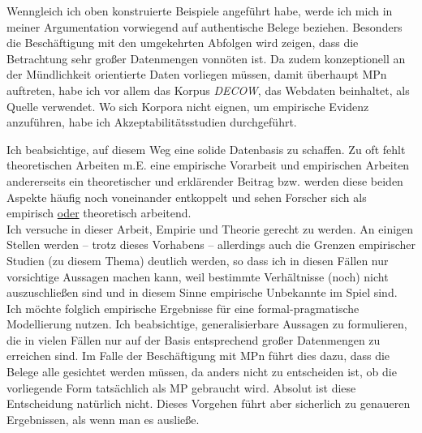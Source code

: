 \noindent
Wenngleich ich oben konstruierte Beispiele angeführt habe, werde ich mich in meiner Argumentation vorwiegend auf authentische Belege beziehen. Besonders die Beschäftigung mit den umgekehrten Abfolgen wird zeigen, dass die Betrachtung sehr großer Datenmengen vonnöten ist. Da zudem konzeptionell an der Mündlichkeit orientierte Daten vorliegen müssen, damit überhaupt MPn auftreten, habe ich vor allem das Korpus \textit{DECOW}, das Webdaten beinhaltet, als Quelle verwendet. Wo sich Korpora nicht eignen, um empirische Evidenz anzufüh\-ren, habe ich Akzeptabilitätsstudien durchgeführt. 

Ich beabsichtige, auf diesem Weg eine solide Datenbasis zu schaffen. Zu oft fehlt theoretischen Arbeiten m.E. eine empirische Vorarbeit und empirischen Arbeiten andererseits ein theoretischer und erklärender Beitrag bzw. werden diese beiden Aspekte häufig noch voneinander entkoppelt und sehen Forscher sich als \glq empirisch\grq {} \underline{oder} \glq theoretisch\grq {} arbeitend. \\

\noindent
Ich versuche in dieser Arbeit, Empirie und Theorie gerecht zu werden. An einigen Stellen werden – trotz dieses Vorhabens – allerdings auch die Grenzen empirischer Studien (zu diesem Thema) deutlich werden, so dass ich in diesen Fällen nur vorsichtige Aussagen machen kann, weil bestimmte Verhältnisse (noch) nicht auszuschließen sind und in diesem Sinne empirische Unbekannte im Spiel sind.\\

\noindent
Ich möchte folglich empirische Ergebnisse für eine formal-pragmatische Modellierung nutzen. Ich beabsichtige, generalisierbare Aussagen zu formulieren, die in vielen Fällen nur auf der Basis entsprechend großer Datenmengen zu errei\-chen sind. Im Falle der Beschäftigung mit MPn führt dies dazu, dass die Belege alle gesichtet werden müssen, da anders nicht zu entscheiden ist, ob die vorliegende Form tatsächlich als MP gebraucht wird. Absolut ist diese Entscheidung natürlich nicht. Dieses Vorgehen führt aber sicherlich zu genaueren Ergebnissen, als wenn man es ausließe.\\

